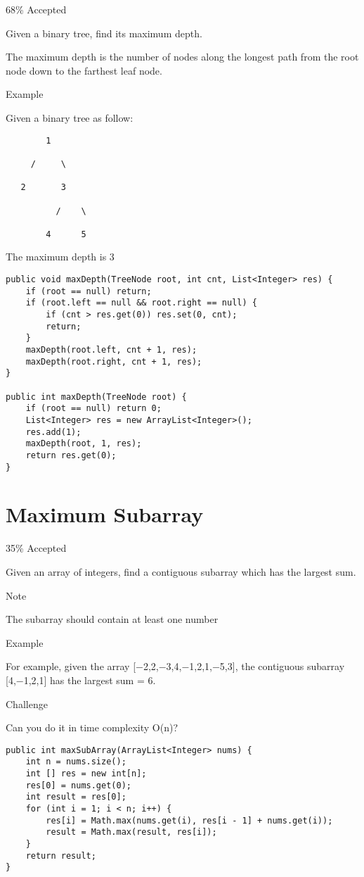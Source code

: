 \documentclass[9pt, b5paaper]{book}
\begin{document}
68\% Accepted

Given a binary tree, find its maximum depth.

The maximum depth is the number of nodes along the longest path from the root node down to the farthest leaf node.

Example

Given a binary tree as follow:
\begin{verbatim}
        1

     /     \ 

   2       3

          /    \

        4      5
\end{verbatim}

The maximum depth is 3
\begin{verbatim}
public void maxDepth(TreeNode root, int cnt, List<Integer> res) {
    if (root == null) return;
    if (root.left == null && root.right == null) {
        if (cnt > res.get(0)) res.set(0, cnt);
        return;
    }
    maxDepth(root.left, cnt + 1, res);
    maxDepth(root.right, cnt + 1, res);
}
        
public int maxDepth(TreeNode root) {
    if (root == null) return 0;
    List<Integer> res = new ArrayList<Integer>();
    res.add(1);
    maxDepth(root, 1, res);
    return res.get(0);
}
\end{verbatim}
\section{Maximum Subarray}
\label{sec-1-39}

35\% Accepted

Given an array of integers, find a contiguous subarray which has the largest sum.

Note

The subarray should contain at least one number

Example

For example, given the array [−2,2,−3,4,−1,2,1,−5,3], the contiguous subarray [4,−1,2,1] has the largest sum = 6.

Challenge

Can you do it in time complexity O(n)?
\begin{verbatim}
public int maxSubArray(ArrayList<Integer> nums) {
    int n = nums.size();
    int [] res = new int[n];
    res[0] = nums.get(0);
    int result = res[0];
    for (int i = 1; i < n; i++) {
        res[i] = Math.max(nums.get(i), res[i - 1] + nums.get(i));
        result = Math.max(result, res[i]);
    }
    return result;
}
\end{verbatim}
\end{document}
